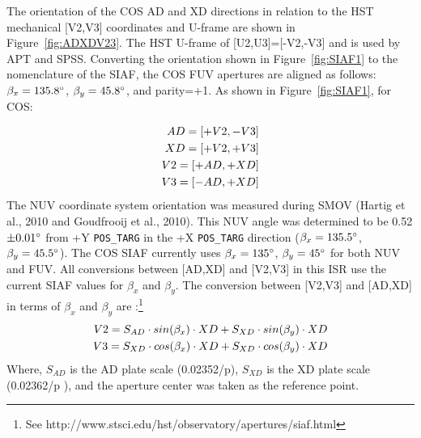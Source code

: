 The orientation of the COS AD and XD directions in relation to the HST mechanical [V2,V3] coordinates
and U-frame are shown in Figure~\ref{fig:ADXDV23}. The HST U-frame of [U2,U3]=[-V2,-V3] and is used by APT
and SPSS.  Converting the orientation shown in Figure~\ref{fig:SIAF1} to
the nomenclature of the SIAF, the COS FUV apertures are aligned as follows:
$\beta_{x}=135.8\hbox{$^{\circ}$}$, $\beta_y=45.8\hbox{$^{\circ}$}$, and parity=+1. As shown in Figure~\ref{fig:SIAF1}, for COS:


\begin{eqnarray}
\setlength\itemsep{0.1em}
AD = [+V2,-V3]\label{eq:ADV23}\\
XD = [+V2,+V3]\label{eq:XDV23}\\
V2 = [+AD,+XD]\label{eq:V2ADXD}\\
V3 = [-AD,+XD]\label{eq:V3ADXD}
\end{eqnarray}
\normalsize
The NUV coordinate system orientation was measured during SMOV (Hartig et al., 2010 and Goudfrooij et al., 2010).
This NUV angle was determined to be 0.52 $\pm 0.01\hbox{$^{\circ}$}$ from +Y \texttt{POS\_TARG} in the +X \texttt{POS\_TARG} direction
($\beta_{x}=135.5\hbox{$^{\circ}$}$, $\beta_y=45.5\hbox{$^{\circ}$}$). The COS SIAF currently uses $\beta_{x}=135\hbox{$^{\circ}$}$, $\beta_y=45\hbox{$^{\circ}$}$ for both NUV and FUV.
All conversions between [AD,XD] and [V2,V3] in this ISR use the current SIAF values for  $\beta_{x}$ and $\beta_{y}$.
The conversion between [V2,V3] and [AD,XD] in terms of $\beta_{x}$ and $\beta_{y}$ are :\footnote{See http://www.stsci.edu/hst/observatory/apertures/siaf.html}
\begin{eqnarray}
\setlength\itemsep{0.1em}
	V2 = S_{AD} \cdot sin(\beta_x) \cdot XD	+ S_{XD} \cdot sin(\beta_y) \cdot XD \label{eq:V2beta}\label{eq:V2BETA}\\
	V3 = S_{XD} \cdot cos(\beta_x) \cdot XD	+ S_{XD} \cdot cos(\beta_y) \cdot XD \label{eq:V3beta}\label{eq:V3BETA}
\end{eqnarray}
Where, $S_{AD}$ is the AD plate scale (0.02352\arcsec/p), $S_{XD}$ is the XD plate scale (0.02362\arcsec/p ), and the aperture center was taken as the reference point.


